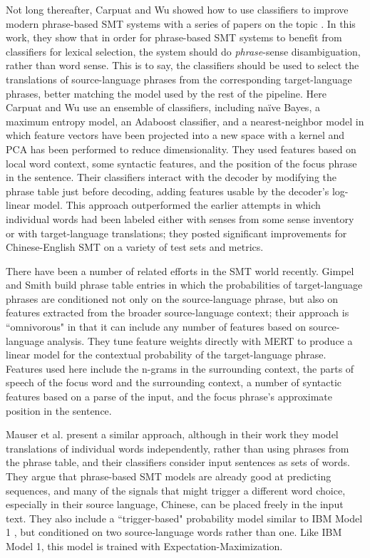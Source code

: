 Not long thereafter, Carpuat and Wu showed how to use classifiers to
improve modern phrase-based SMT systems with a series of papers on the topic
\cite{carpuatpsd,carpuat-wu:2007:EMNLP-CoNLL2007,carpuat2008evaluation,improvingsmtwsd}.
In this work, they show that in order for phrase-based SMT systems to benefit
from classifiers for lexical selection, the system should do
\emph{phrase}-sense disambiguation, rather than word sense. This is to say, the
classifiers should be used to select the translations of source-language
phrases from the corresponding target-language phrases, better matching the
model used by the rest of the pipeline.
Here Carpuat and Wu use an ensemble of classifiers, including naïve Bayes, a
maximum entropy model, an Adaboost classifier, and a nearest-neighbor model in
which feature vectors have been projected into a new space with a kernel and
PCA has been performed to reduce dimensionality.
They used features based on local word context, some syntactic features, and
the position of the focus phrase in the sentence. Their classifiers interact
with the decoder by modifying the phrase table just before decoding, adding
features usable by the decoder's log-linear model.
This approach outperformed the earlier attempts in which individual words had
been labeled either with senses from some sense inventory or with
target-language translations; they posted significant improvements for
Chinese-English SMT on a variety of test sets and metrics.

There have been a number of related efforts in the SMT world recently.
Gimpel and Smith \cite{gimpel-smith:2008:WMT} build phrase table entries in
which the probabilities of target-language phrases are conditioned not only on
the source-language phrase, but also on features extracted from the broader
source-language context; their approach is ``omnivorous" in that it can include
any number of features based on source-language analysis. They tune feature
weights directly with MERT to produce a linear model for the contextual
probability of the target-language phrase. Features used here include the
n-grams in the surrounding context, the parts of speech of the focus word and
the surrounding context, a number of syntactic features based on a parse of
the input, and the focus phrase's approximate position in the sentence.

Mauser et al. \cite{mauser-hasan-ney:2009:EMNLP} present a similar approach,
although in their work they model translations of individual words
independently, rather than using phrases from the phrase table, and their
classifiers consider input sentences as sets of words. They argue that
phrase-based SMT models are already good at predicting sequences, and many of
the signals that might trigger a different word choice, especially in their
source language, Chinese, can be placed freely in the input text. They also
include a ``trigger-based" probability model similar to IBM Model 1
\cite{DBLP:journals/coling/BrownPPM94}, but conditioned on two source-language
words rather than one. Like IBM Model 1, this model is trained with
Expectation-Maximization.

